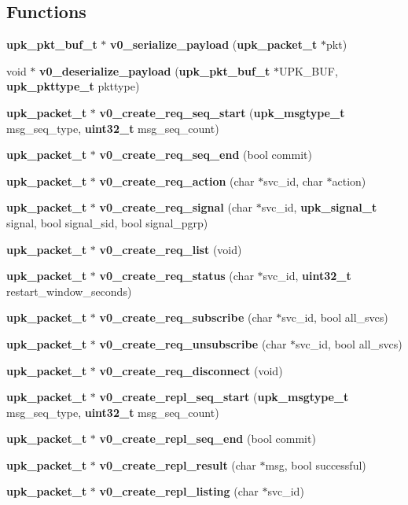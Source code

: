 \subsection*{Functions}
\begin{DoxyCompactItemize}
\item 
{\bf upk\_\-pkt\_\-buf\_\-t} $\ast$ {\bf v0\_\-serialize\_\-payload} ({\bf upk\_\-packet\_\-t} $\ast$pkt)
\item 
void $\ast$ {\bf v0\_\-deserialize\_\-payload} ({\bf upk\_\-pkt\_\-buf\_\-t} $\ast$UPK\_\-BUF, {\bf upk\_\-pkttype\_\-t} pkttype)
\item 
{\bf upk\_\-packet\_\-t} $\ast$ {\bf v0\_\-create\_\-req\_\-seq\_\-start} ({\bf upk\_\-msgtype\_\-t} msg\_\-seq\_\-type, {\bf uint32\_\-t} msg\_\-seq\_\-count)
\item 
{\bf upk\_\-packet\_\-t} $\ast$ {\bf v0\_\-create\_\-req\_\-seq\_\-end} (bool commit)
\item 
{\bf upk\_\-packet\_\-t} $\ast$ {\bf v0\_\-create\_\-req\_\-action} (char $\ast$svc\_\-id, char $\ast$action)
\item 
{\bf upk\_\-packet\_\-t} $\ast$ {\bf v0\_\-create\_\-req\_\-signal} (char $\ast$svc\_\-id, {\bf upk\_\-signal\_\-t} signal, bool signal\_\-sid, bool signal\_\-pgrp)
\item 
{\bf upk\_\-packet\_\-t} $\ast$ {\bf v0\_\-create\_\-req\_\-list} (void)
\item 
{\bf upk\_\-packet\_\-t} $\ast$ {\bf v0\_\-create\_\-req\_\-status} (char $\ast$svc\_\-id, {\bf uint32\_\-t} restart\_\-window\_\-seconds)
\item 
{\bf upk\_\-packet\_\-t} $\ast$ {\bf v0\_\-create\_\-req\_\-subscribe} (char $\ast$svc\_\-id, bool all\_\-svcs)
\item 
{\bf upk\_\-packet\_\-t} $\ast$ {\bf v0\_\-create\_\-req\_\-unsubscribe} (char $\ast$svc\_\-id, bool all\_\-svcs)
\item 
{\bf upk\_\-packet\_\-t} $\ast$ {\bf v0\_\-create\_\-req\_\-disconnect} (void)
\item 
{\bf upk\_\-packet\_\-t} $\ast$ {\bf v0\_\-create\_\-repl\_\-seq\_\-start} ({\bf upk\_\-msgtype\_\-t} msg\_\-seq\_\-type, {\bf uint32\_\-t} msg\_\-seq\_\-count)
\item 
{\bf upk\_\-packet\_\-t} $\ast$ {\bf v0\_\-create\_\-repl\_\-seq\_\-end} (bool commit)
\item 
{\bf upk\_\-packet\_\-t} $\ast$ {\bf v0\_\-create\_\-repl\_\-result} (char $\ast$msg, bool successful)
\item 
{\bf upk\_\-packet\_\-t} $\ast$ {\bf v0\_\-create\_\-repl\_\-listing} (char $\ast$svc\_\-id)

\end{DoxyCompactItemize}
